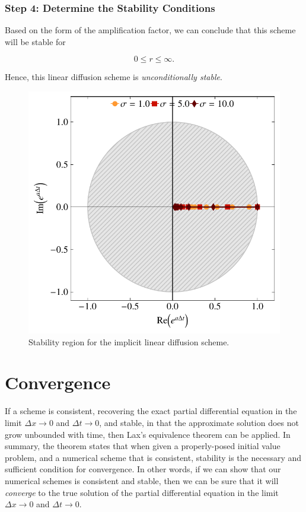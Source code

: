 \subsubsection{Step 4: Determine the Stability Conditions}
Based on the form of the amplification factor, we can conclude that this scheme will be stable for
\begin{eqBox}
\begin{equation}
	0 \leq r \leq \infty.
\end{equation}
\end{eqBox}
Hence, this linear diffusion scheme is {\it unconditionally stable}.
\begin{figure}[htbp]
	\centering
	\includegraphics[width=0.6\linewidth]{Pictures/implicit_diffusion}
	\caption{Stability region for the implicit linear diffusion scheme.}
	\label{fig:implicit_diffusion}
\end{figure}

\section{Convergence}
If a scheme is consistent, recovering the exact partial differential equation in the limit $\Delta x \rightarrow 0$ and $\Delta t \rightarrow 0$, and stable, in that the approximate solution does not grow unbounded with time, then Lax's equivalence theorem can be applied. In summary, the theorem states that when given a properly-posed initial value problem, and a numerical scheme that is consistent, stability is the necessary and sufficient condition for convergence. In other words, if we can show that our numerical schemes is consistent and stable, then we can be sure that it will {\it converge} to the true solution of the partial differential equation in the limit $\Delta x \rightarrow 0$ and $\Delta t \rightarrow 0$.

